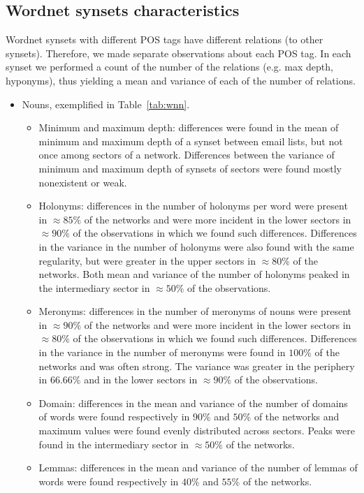 \documentclass[review]{elsarticle}
\begin{document}
\subsection{Wordnet synsets characteristics}\label{subsec:wn1}
Wordnet synsets with different POS tags have different relations (to other synsets).
Therefore, we made separate observations about each POS tag.
In each synset we performed a count of the number of the relations (e.g. max depth, hyponyms),
thus yielding a mean and variance of each of the number of relations.
\begin{itemize}
\item Nouns, exemplified in Table~\ref{tab:wnn}.
\begin{itemize}
\item Minimum and maximum depth: 
differences were found in the mean of minimum and maximum depth of a synset between email lists,
but not once among sectors of a network.
Differences between the variance of minimum and maximum depth of synsets of sectors were found mostly nonexistent or weak.
\item Holonyms:
differences in the number of holonyms per word were present in $\approx 85\%$ of the networks and were
more incident in the lower sectors in $\approx 90\%$ of the observations in which we found such differences.
Differences in the variance in the number of holonyms were also found with the same regularity,
but were greater in the upper sectors in $\approx 80\%$ of the networks.
Both mean and variance of the number of holonyms peaked in the intermediary sector in $\approx50\%$ of the observations.
\item Meronyms:
differences in the number of meronyms of nouns were present in $\approx 90\%$ of the networks and were
more incident in the lower sectors in $\approx 80\%$ of the observations in which we found such differences.
Differences in the variance in the number of meronyms were found in $100\%$ of the networks and was often strong.
The variance was greater in the periphery in $66.66\%$ and in the lower sectors in $\approx 90\%$ of the observations.
\item Domain:
differences in the mean and variance of the number of domains of words were found respectively in $90\%$ and $50\%$ of the networks and maximum values were found evenly distributed across sectors.
Peaks were found in the intermediary sector in $\approx 50\%$ of the networks.
\item Lemmas:
differences in the mean and variance of the number of lemmas of words were found respectively in $40\%$ and $55\%$ of the networks.

\end{itemize}
\end{itemize}
\end{document}
